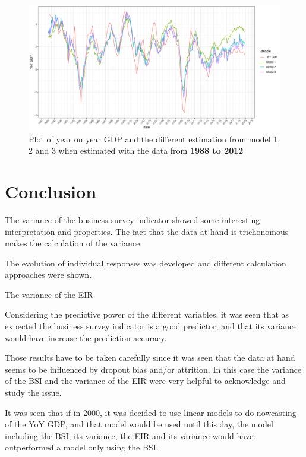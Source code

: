\documentclass[12pt,a4paper,oneside]{book}
\begin{document}
\begin{figure}[H]
    \centering
    \includegraphics[scale=0.5]{Graphs/predictions3.pdf}
    \caption{Plot of year on year GDP and the different estimation from model 1, 2 and 3 when estimated with the data from \textbf{1988 to 2012}}
    \label{fig:predictions3}
\end{figure}











\chapter{Conclusion}

The variance of the business survey indicator showed some interesting interpretation and properties. The fact that the data at hand is trichonomous makes the calculation of the variance

The evolution of individual responses was developed and different calculation approaches were shown.

The variance of the EIR

Considering the predictive power of the different variables, it was seen that as expected the business survey indicator is a good predictor, and that its variance would have increase the prediction accuracy.

Those results have to be taken carefully since it was seen that the data at hand seems to be influenced by dropout bias and/or attrition. In this case the variance of the BSI and the variance of the EIR were very helpful to acknowledge and study the issue.


It was seen that if in 2000, it was decided to use linear models to do nowcasting of the YoY GDP, and that model would be used until this day, the model including the BSI, its variance, the EIR and its variance would have outperformed a model only using the BSI.
\end{document}
